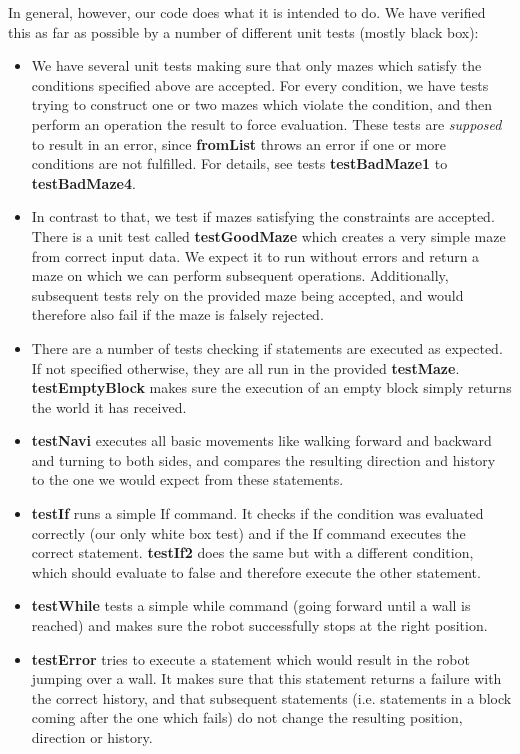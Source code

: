 \documentclass[a4paper]{article}
\begin{document}
In general, however, our code does what it is intended to do. We have verified this as far as possible by a number of different unit tests (mostly black box):
\begin{itemize}
  \item We have several unit tests making sure that only mazes which satisfy the conditions specified above are accepted. For every condition, we have tests trying to construct one or two mazes which violate the condition, and then perform an operation the result to force evaluation. These tests are \emph{supposed} to result in an error, since \textbf{fromList} throws an error if one or more conditions are not fulfilled. For details, see tests \textbf{testBadMaze1} to \textbf{testBadMaze4}.
  \item In contrast to that, we test if mazes satisfying the constraints are accepted. There is a unit test called \textbf{testGoodMaze} which creates a very simple maze from correct input data. We expect it to run without errors and return a maze on which we can perform subsequent operations. Additionally, subsequent tests rely on the provided maze being accepted, and would therefore also fail if the maze is falsely rejected.
  \item There are a number of tests checking if statements are executed as expected. If not specified otherwise, they are all run in the provided \textbf{testMaze}. \textbf{testEmptyBlock} makes sure the execution of an empty block simply returns the world it has received.
  \item \textbf{testNavi} executes all basic movements like walking forward and backward and turning to both sides, and compares the resulting direction and history to the one we would expect from these statements.
  \item \textbf{testIf} runs a simple If command. It checks if the condition was evaluated correctly (our only white box test) and if the If command executes the correct statement. \textbf{testIf2} does the same but with a different condition, which should evaluate to false and therefore execute the other statement.
  \item \textbf{testWhile} tests a simple while command (going forward until a wall is reached) and makes sure the robot successfully stops at the right position.
  \item \textbf{testError} tries to execute a statement which would result in the robot jumping over a wall. It makes sure that this statement returns a failure with the correct history, and that subsequent statements (i.e. statements in a block coming after the one which fails) do not change the resulting position, direction or history.
\end{itemize}
\end{document}
